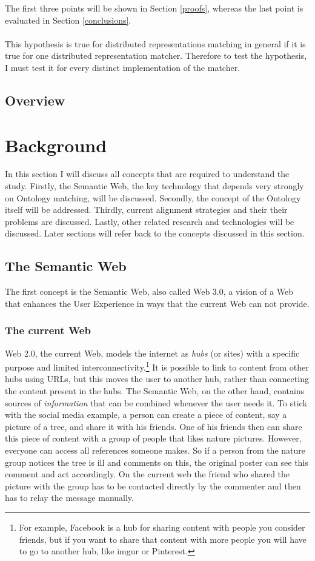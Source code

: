 \documentclass{article}
\begin{document}
 The first three points will be shown in Section \ref{proofs}, whereas the last point is evaluated in Section \ref{conclusions}.
 \paragraph{}
 This hypothesis is true for distributed representations matching in general if it is true for one distributed representation matcher. Therefore to test the hypothesis, I must test it for every distinct implementation of the matcher.
 
 \subsection{Overview} %

 
\newpage
\section{Background}
 In this section I will discuss all concepts that are required to understand the study. Firstly, the Semantic Web, the key technology that depends very strongly on Ontology matching, will be discussed. Secondly, the concept of the Ontology itself will be addressed. Thirdly, current alignment strategies and their their problems are discussed. Lastly, other related research and technologies will be discussed. Later sections will refer back to the concepts discussed in this section.
 \subsection{The Semantic Web}
  The first concept is the Semantic Web, also called Web 3.0, a vision of a Web that enhances the User Experience in ways that the current Web can not provide. 
 \subsubsection{The current Web}
Web 2.0, the current Web, models the internet as \textit{hubs} (or sites) with a specific purpose and limited interconnectivity.\footnote{For example, Facebook is a hub for sharing content with people you consider friends, but if you want to share that content with more people you will have to go to another hub, like imgur or Pinterest.} It is possible to link to content from other hubs using URLs, but this moves the user to another hub, rather than connecting the content present in the hubs.
The Semantic Web, on the other hand, contains sources of \textit{information} that can be combined whenever the user needs it. To stick with the social media example, a person can create a piece of content, say a picture of a tree, and share it with his friends. One of his friends then can share this piece of content with a group of people that likes nature pictures. However, everyone can access all references someone makes. So if a person from the nature group notices the tree is ill and comments on this, the original poster can see this comment and act accordingly. On the current web the friend who shared the picture with the group has to be contacted directly by the commenter and then has to relay the message manually.
\end{document}

